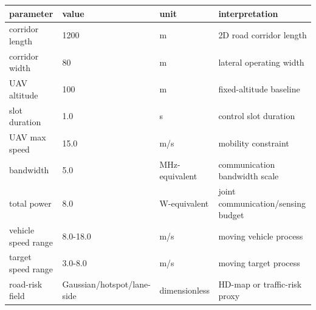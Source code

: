 \begin{tabular}{llll}
\toprule
parameter & value & unit & interpretation \\
\midrule
corridor length & 1200 & m & 2D road corridor length \\
corridor width & 80 & m & lateral operating width \\
UAV altitude & 100 & m & fixed-altitude baseline \\
slot duration & 1.0 & s & control slot duration \\
UAV max speed & 15.0 & m/s & mobility constraint \\
bandwidth & 5.0 & MHz-equivalent & communication bandwidth scale \\
total power & 8.0 & W-equivalent & joint communication/sensing budget \\
vehicle speed range & 8.0-18.0 & m/s & moving vehicle process \\
target speed range & 3.0-8.0 & m/s & moving target process \\
road-risk field & Gaussian/hotspot/lane-side & dimensionless & HD-map or traffic-risk proxy \\
\bottomrule
\end{tabular}

